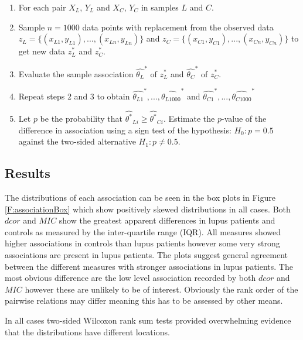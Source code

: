 \documentclass[a4paper, 12pt]{report}
\begin{document}
\begin{enumerate}

\item For each pair $X_L$, $Y_L$ and $X_C$, $Y_C$ in samples $L$ and $C$.
\item Sample $n=1000$ data points with replacement from the observed data $z_L = \{ (x_{L1},y_{L1}),...,(x_{Ln},y_{Ln}) \}$ and $z_C = \{ (x_{C1},y_{C1}),...,(x_{Cn},y_{Cn}) \}$ to get new data $z_L^*$ and $z_C^*$.
\item Evaluate the sample association $\hat{\theta_L}^*$ of $z_L^*$ and $\hat{\theta_C}^*$ of $z_C^*$.
\item Repeat steps 2 and 3 to obtain $\hat{\theta_{L1}}^*,...,\hat{\theta_{L1000}}^*$ and $\hat{\theta_{C1}}^*,...,\hat{\theta_{C1000}}^*$
\item Let $p$ be the probability that $\hat{\theta^*}_{Li} \ge \hat{\theta^*}_{Ci}$. Estimate the $p$-value of the difference in association using a sign test of the hypothesis: $H_0: p = 0.5$ against the two-sided alternative $H_1: p \ne 0.5$. 

\end{enumerate}
\subsection*{Results}
The distributions of each association can be seen in the box plots in Figure \ref{F:associationBox} which show positively skewed distributions in all cases. Both $dcor$ and $MIC$ show the greatest apparent differences in lupus patients and controls as measured by the inter-quartile range (IQR). All measures showed higher associations in controls than lupus patients however some very strong associations are present in lupus patients. The plots suggest general agreement between the different measures with stronger associations in lupus patients. The most obvious difference are the low level association recorded by both $dcor$ and $MIC$ however these are unlikely to be of interest. Obviously the rank order of the pairwise relations may differ meaning this has to be assessed by other means.

In all cases two-sided Wilcoxon rank sum tests provided overwhelming evidence that the distributions have different locations.
\end{document}
